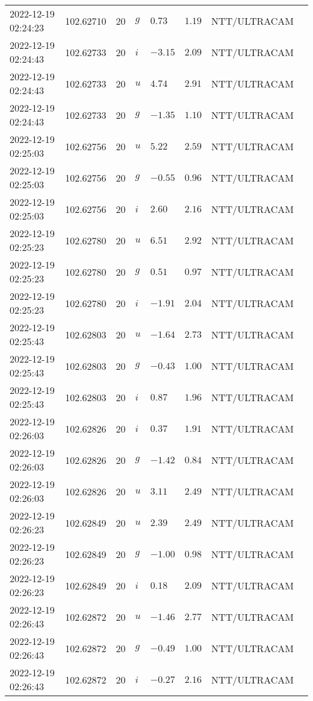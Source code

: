 \documentclass{nature_plusfigure}
\begin{document}
\begin{supplement}
\begin{center}
\begin{longtable}{llllllll}
2022-12-19 02:24:23 & 102.62710 & 20 & $g$ & $0.73$ & $1.19$ & NTT/ULTRACAM &  \\ 
2022-12-19 02:24:43 & 102.62733 & 20 & $i$ & $-3.15$ & $2.09$ & NTT/ULTRACAM &  \\ 
2022-12-19 02:24:43 & 102.62733 & 20 & $u$ & $4.74$ & $2.91$ & NTT/ULTRACAM &  \\ 
2022-12-19 02:24:43 & 102.62733 & 20 & $g$ & $-1.35$ & $1.10$ & NTT/ULTRACAM &  \\ 
2022-12-19 02:25:03 & 102.62756 & 20 & $u$ & $5.22$ & $2.59$ & NTT/ULTRACAM &  \\ 
2022-12-19 02:25:03 & 102.62756 & 20 & $g$ & $-0.55$ & $0.96$ & NTT/ULTRACAM &  \\ 
2022-12-19 02:25:03 & 102.62756 & 20 & $i$ & $2.60$ & $2.16$ & NTT/ULTRACAM &  \\ 
2022-12-19 02:25:23 & 102.62780 & 20 & $u$ & $6.51$ & $2.92$ & NTT/ULTRACAM &  \\ 
2022-12-19 02:25:23 & 102.62780 & 20 & $g$ & $0.51$ & $0.97$ & NTT/ULTRACAM &  \\ 
2022-12-19 02:25:23 & 102.62780 & 20 & $i$ & $-1.91$ & $2.04$ & NTT/ULTRACAM &  \\ 
2022-12-19 02:25:43 & 102.62803 & 20 & $u$ & $-1.64$ & $2.73$ & NTT/ULTRACAM &  \\ 
2022-12-19 02:25:43 & 102.62803 & 20 & $g$ & $-0.43$ & $1.00$ & NTT/ULTRACAM &  \\ 
2022-12-19 02:25:43 & 102.62803 & 20 & $i$ & $0.87$ & $1.96$ & NTT/ULTRACAM &  \\ 
2022-12-19 02:26:03 & 102.62826 & 20 & $i$ & $0.37$ & $1.91$ & NTT/ULTRACAM &  \\ 
2022-12-19 02:26:03 & 102.62826 & 20 & $g$ & $-1.42$ & $0.84$ & NTT/ULTRACAM &  \\ 
2022-12-19 02:26:03 & 102.62826 & 20 & $u$ & $3.11$ & $2.49$ & NTT/ULTRACAM &  \\ 
2022-12-19 02:26:23 & 102.62849 & 20 & $u$ & $2.39$ & $2.49$ & NTT/ULTRACAM &  \\ 
2022-12-19 02:26:23 & 102.62849 & 20 & $g$ & $-1.00$ & $0.98$ & NTT/ULTRACAM &  \\ 
2022-12-19 02:26:23 & 102.62849 & 20 & $i$ & $0.18$ & $2.09$ & NTT/ULTRACAM &  \\ 
2022-12-19 02:26:43 & 102.62872 & 20 & $u$ & $-1.46$ & $2.77$ & NTT/ULTRACAM &  \\ 
2022-12-19 02:26:43 & 102.62872 & 20 & $g$ & $-0.49$ & $1.00$ & NTT/ULTRACAM &  \\ 
2022-12-19 02:26:43 & 102.62872 & 20 & $i$ & $-0.27$ & $2.16$ & NTT/ULTRACAM &  \\ 

\end{longtable}
\end{center}
\end{supplement}
\end{document}
